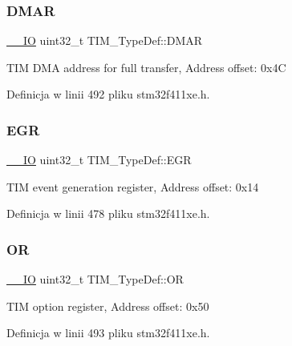 \subsubsection{\texorpdfstring{D\+M\+AR}{DMAR}}
{\footnotesize\ttfamily \hyperlink{core__sc300_8h_aec43007d9998a0a0e01faede4133d6be}{\+\_\+\+\_\+\+IO} uint32\+\_\+t T\+I\+M\+\_\+\+Type\+Def\+::\+D\+M\+AR}

T\+IM D\+MA address for full transfer, Address offset\+: 0x4C 

Definicja w linii 492 pliku stm32f411xe.\+h.

\mbox{\label{struct_t_i_m___type_def_a04248d87f48303fd2267810104a7878d}} 
\subsubsection{\texorpdfstring{E\+GR}{EGR}}
{\footnotesize\ttfamily \hyperlink{core__sc300_8h_aec43007d9998a0a0e01faede4133d6be}{\+\_\+\+\_\+\+IO} uint32\+\_\+t T\+I\+M\+\_\+\+Type\+Def\+::\+E\+GR}

T\+IM event generation register, Address offset\+: 0x14 

Definicja w linii 478 pliku stm32f411xe.\+h.

\mbox{\label{struct_t_i_m___type_def_acb0e8a4efa46dac4a2fb1aa3d45924fd}} 
\subsubsection{\texorpdfstring{OR}{OR}}
{\footnotesize\ttfamily \hyperlink{core__sc300_8h_aec43007d9998a0a0e01faede4133d6be}{\+\_\+\+\_\+\+IO} uint32\+\_\+t T\+I\+M\+\_\+\+Type\+Def\+::\+OR}

T\+IM option register, Address offset\+: 0x50 

Definicja w linii 493 pliku stm32f411xe.\+h.

\mbox{\label{struct_t_i_m___type_def_ad03c852f58077a11e75f8af42fa6d921}} 
